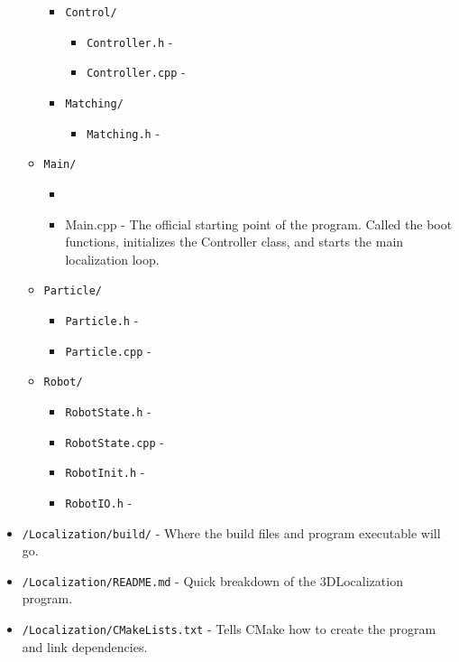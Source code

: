 \documentclass[a4paper,11pt]{article}
\begin{document}
\begin{itemize}
\begin{itemize}
\begin{itemize}
\begin{itemize}
            \end{itemize}
          \item \texttt{Control/}
            \begin{itemize}
              \item \texttt{Controller.h} -
              \item \texttt{Controller.cpp} -
            \end{itemize}
          \item \texttt{Matching/}
            \begin{itemize}
              \item \texttt{Matching.h} -
            \end{itemize}
        \end{itemize}
      \item \texttt{Main/}
        \begin{itemize}
          \item \item{Main.cpp} - The official starting point of the program. Called the boot functions, initializes the Controller class, and starts the main localization loop.
        \end{itemize}
      \item \texttt{Particle/}
        \begin{itemize}
          \item \texttt{Particle.h} -
          \item \texttt{Particle.cpp} -
        \end{itemize}
      \item \texttt{Robot/}
        \begin{itemize}
          \item \texttt{RobotState.h} -
          \item \texttt{RobotState.cpp} -
          \item \texttt{RobotInit.h} -
          \item \texttt{RobotIO.h} -
        \end{itemize}
    \end{itemize}
    \item \texttt{/Localization/build/} - Where the build files and program executable will go.
    \item \texttt{/Localization/README.md} - Quick breakdown of the 3DLocalization program.
    \item \texttt{/Localization/CMakeLists.txt} - Tells CMake how to create the program and link dependencies.
  \end{itemize}
\end{document}
